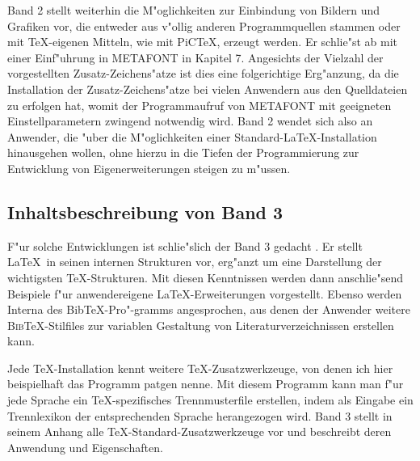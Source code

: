 \documentclass{report}
\begin{document}
Band 2 stellt weiterhin die M"oglichkeiten zur Einbindung von Bildern und
Grafiken vor, die entweder aus v"ollig anderen Programmquellen stammen oder
mit \TeX-eigenen Mitteln, wie mit PiC\TeX, erzeugt werden.
Er schlie"st ab mit einer Einf"uhrung in METAFONT in Kapitel 7. Angesichts der
Vielzahl der vorgestellten Zusatz-Zeichens"atze ist dies eine folgerichtige
Erg"anzung, da die Installation der Zusatz-Zeichens"atze bei vielen Anwendern
aus den Quelldateien zu erfolgen hat, womit der Programmaufruf von METAFONT
mit geeigneten Einstellparametern zwingend notwendig wird.
Band 2 wendet sich also an Anwender, die "uber die M"oglichkeiten 
einer Standard-\LaTeX-Installation hinausgehen wollen, ohne hierzu
in die Tiefen der Programmierung zur Entwicklung von Eigenerweiterungen
steigen zu m"ussen.

\subsection{Inhaltsbeschreibung von Band 3}
F"ur solche Entwicklungen ist schlie"slich der Band 3 gedacht \cite{hk3}.
Er stellt \LaTeX\ in seinen internen Strukturen vor, erg"anzt um eine
Darstellung der wichtigsten \TeX-Strukturen. Mit diesen Kenntnissen werden dann
anschlie"send Beispiele f"ur anwendereigene \LaTeX-Erweiterungen vorgestellt.
Ebenso werden Interna des Bib\TeX-Pro"-gramms angesprochen, aus denen
der Anwender weitere \textsc{Bib}\TeX-Stilfiles zur variablen Gestaltung
von Literaturverzeichnissen erstellen kann.

Jede \TeX-Installation kennt weitere  \TeX-Zusatzwerkzeuge, von denen ich hier
beispielhaft das Programm patgen nenne. Mit diesem Programm kann man
f"ur jede Sprache ein \TeX-spezifisches Trennmusterfile erstellen,
indem als Eingabe ein Trennlexikon der entsprechenden Sprache herangezogen
wird. Band 3 stellt in seinem Anhang alle \TeX-Standard-Zusatzwerkzeuge vor und
beschreibt deren Anwendung und Eigenschaften.
\end{document}
